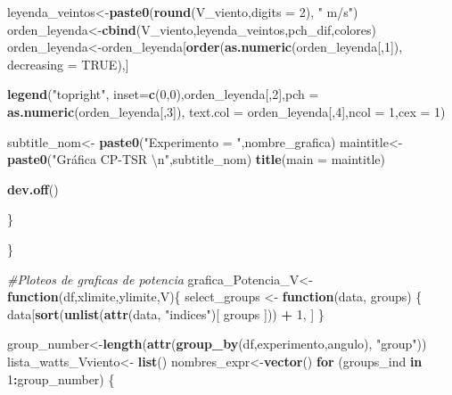 \documentclass[]{article}
\newenvironment{Shaded}{\begin{snugshade}}{\end{snugshade}}
\newcommand{\KeywordTok}[1]{\textcolor[rgb]{0.13,0.29,0.53}{\textbf{#1}}}
\newcommand{\DataTypeTok}[1]{\textcolor[rgb]{0.13,0.29,0.53}{#1}}
\newcommand{\DecValTok}[1]{\textcolor[rgb]{0.00,0.00,0.81}{#1}}
\newcommand{\CharTok}[1]{\textcolor[rgb]{0.31,0.60,0.02}{#1}}
\newcommand{\StringTok}[1]{\textcolor[rgb]{0.31,0.60,0.02}{#1}}
\newcommand{\CommentTok}[1]{\textcolor[rgb]{0.56,0.35,0.01}{\textit{#1}}}
\newcommand{\OtherTok}[1]{\textcolor[rgb]{0.56,0.35,0.01}{#1}}
\newcommand{\ControlFlowTok}[1]{\textcolor[rgb]{0.13,0.29,0.53}{\textbf{#1}}}
\newcommand{\OperatorTok}[1]{\textcolor[rgb]{0.81,0.36,0.00}{\textbf{#1}}}
\newcommand{\NormalTok}[1]{#1}
\begin{document}
\begin{Shaded}
\begin{Highlighting}[]
{{\NormalTok{    leyenda_veintos<-}\KeywordTok{paste0}\NormalTok{(}\KeywordTok{round}\NormalTok{(V_viento,}\DataTypeTok{digits =} \DecValTok{2}\NormalTok{), }\StringTok{" m/s"}\NormalTok{)}
\NormalTok{    orden_leyenda<-}\KeywordTok{cbind}\NormalTok{(V_viento,leyenda_veintos,pch_dif,colores)}
\NormalTok{    orden_leyenda<-orden_leyenda[}\KeywordTok{order}\NormalTok{(}\KeywordTok{as.numeric}\NormalTok{(orden_leyenda[,}\DecValTok{1}\NormalTok{]), }\DataTypeTok{decreasing =} \OtherTok{TRUE}\NormalTok{),]}
    
    \KeywordTok{legend}\NormalTok{(}\StringTok{"topright"}\NormalTok{, }\DataTypeTok{inset=}\KeywordTok{c}\NormalTok{(}\DecValTok{0}\NormalTok{,}\DecValTok{0}\NormalTok{),orden_leyenda[,}\DecValTok{2}\NormalTok{],}\DataTypeTok{pch =} \KeywordTok{as.numeric}\NormalTok{(orden_leyenda[,}\DecValTok{3}\NormalTok{]),}
           \DataTypeTok{text.col =}\NormalTok{ orden_leyenda[,}\DecValTok{4}\NormalTok{],}\DataTypeTok{ncol =} \DecValTok{1}\NormalTok{,}\DataTypeTok{cex =} \DecValTok{1}\NormalTok{)}
    
\NormalTok{    subtitle_nom<-}\StringTok{ }\KeywordTok{paste0}\NormalTok{(}\StringTok{"Experimento = "}\NormalTok{,nombre_grafica)}
\NormalTok{    maintitle<-}\StringTok{ }\KeywordTok{paste0}\NormalTok{(}\StringTok{"Gráfica CP-TSR }\CharTok{\textbackslash{}n}\StringTok{"}\NormalTok{,subtitle_nom)}
    \KeywordTok{title}\NormalTok{(}\DataTypeTok{main =}\NormalTok{ maintitle)}
    
    \KeywordTok{dev.off}\NormalTok{()}
    
\NormalTok{  \}}
  
\NormalTok{\}}

\CommentTok{#Ploteos de graficas de potencia}
\NormalTok{grafica_Potencia_V<-}\ControlFlowTok{function}\NormalTok{(df,xlimite,ylimite,V)\{}
\NormalTok{  select_groups <-}\StringTok{ }\ControlFlowTok{function}\NormalTok{(data, groups) \{}
\NormalTok{    data[}\KeywordTok{sort}\NormalTok{(}\KeywordTok{unlist}\NormalTok{(}\KeywordTok{attr}\NormalTok{(data, }\StringTok{"indices"}\NormalTok{)[ groups ])) }\OperatorTok{+}\StringTok{ }\DecValTok{1}\NormalTok{, ]}
\NormalTok{  \}}
  
\NormalTok{  group_number<-}\KeywordTok{length}\NormalTok{(}\KeywordTok{attr}\NormalTok{(}\KeywordTok{group_by}\NormalTok{(df,experimento,angulo), }\StringTok{"group"}\NormalTok{))}
\NormalTok{  lista_watts_Vviento<-}\StringTok{ }\KeywordTok{list}\NormalTok{()}
\NormalTok{  nombres_expr<-}\KeywordTok{vector}\NormalTok{()}
  \ControlFlowTok{for}\NormalTok{ (groups_ind }\ControlFlowTok{in} \DecValTok{1}\OperatorTok{:}\NormalTok{group_number) \{}
    
}}
\end{Highlighting}
\end{Shaded}
\end{document}
